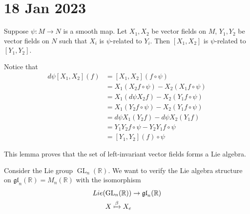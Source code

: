 \documentclass[11pt,a4paper]{scrarticle}
\theoremstyle{definition}
\renewenvironment{proof}[1][\proofname]{\vspace{-10pt}\begin{myproof}}{\end{myproof}}
\theoremstyle{greenbox}
\newcommand{\R}{\mathbb{R}}
\begin{document}
    \section{18 Jan 2023}
    \vspace{2pt}
    \begin{lemma}
        Suppose $ \psi : M \to N  $ is a smooth map. Let $ X_{1},X_{2} $ be vector fields on $ M $, $ Y_{1},Y_{2} $ be vector fields on $ N $ such that $ X_{i} $ is $ \psi $-related to $ Y_{i} $. Then $ [X_{1},X_{2}]  $ is $ \psi $-related to $ [Y_{1},Y_{2}] $.
    \end{lemma}
    \begin{proof}
        Notice that \begin{align*}
            d \psi [X_{1},X_{2}](f) & = [X_{1},X_{2}]( f\circ \psi) \\
            & = X_{1}(X_{2} f \circ \psi) - X_{2}(X_{1} f\circ \psi) \\
            & = X_{1}( d \psi X_{2}f) -X_{2}(Y_{1} f \circ \psi) \\
            & = X_{1}(Y_{2} f \circ \psi) - X_{2}(Y_{1} f\circ \psi) \\
            & = d \psi X_{1}(Y_{2}f)- d \psi X_{2}(Y_{1}f) \\
            & = Y_{1}Y_{2} f\circ \psi - Y_{2}Y_{1}f \circ \psi \\
            & = [Y_{1},Y_{2}](f)\circ \psi
        \end{align*}
    \end{proof}
    This lemma proves that the set of left-invariant vector fields forms a Lie algebra. 

    Consider the Lie group $ \operatorname{GL}_{n}(\R) $. We want to verify the Lie algebra structure on $ \mathfrak{gl}_{n}(\R)  = M_{n}(\R)$ with the isomorphism \begin{align*}
        Lie(\operatorname{GL}_{n}(\R)) & \to \mathfrak{gl}_{n}(\R)\\ 
        X \xmapsto[]{\beta} X_{e}
    \end{align*}
\end{document}
